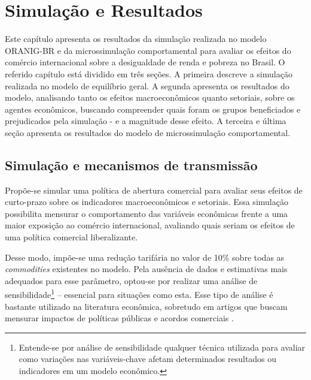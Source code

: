 

\chapter{Simulação e Resultados} \label{cha:resultados}

Este capítulo apresenta os resultados da simulação realizada no modelo ORANIG-BR e da microssimulação comportamental para avaliar os efeitos do comércio internacional sobre a desigualdade de renda e pobreza no Brasil. O referido capítulo está dividido em três seções. A primeira descreve a simulação realizada no modelo de equilíbrio geral. A segunda apresenta os resultados do modelo, analisando tanto os efeitos macroeconômicos quanto setoriais, sobre os agentes econômicos, buscando compreender quais foram os grupos beneficiados e prejudicados pela simulação - e a magnitude desse efeito. A terceira e última seção apresenta os resultados do modelo de microssimulação comportamental.



\section{Simulação e mecanismos de transmissão} \label{sec:simulacao}

Propõe-se simular uma política de abertura comercial para avaliar seus efeitos de curto-prazo sobre os indicadores macroeconômicos e setoriais. Essa simulação possibilita mensurar o comportamento das variáveis econômicas frente a uma maior exposição ao comércio internacional, avaliando quais seriam os efeitos de uma política comercial liberalizante.

Desse modo, impõe-se uma redução tarifária no valor de 10\% sobre todas as \textit{commodities} existentes no modelo. Pela ausência de dados e estimativas mais adequados para esse parâmetro, optou-se por realizar uma análise de sensibilidade\footnote{Entende-se por análise de sensibilidade qualquer técnica utilizada para avaliar como variações nas variáveis-chave afetam determinados resultados ou indicadores em um modelo econômico.} -- essencial para situações como esta. Esse tipo de análise é bastante utilizado na literatura econômica, sobretudo em artigos que buscam mensurar impactos de políticas públicas e acordos comerciais \cite{haddad05, domingues08,perobelli17}.


